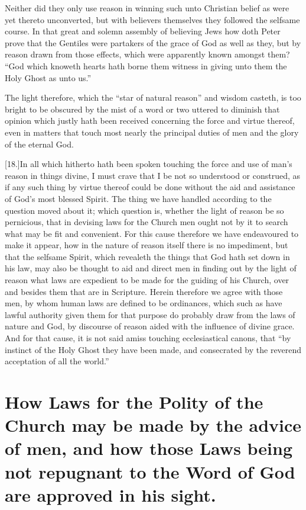 Neither did they only use reason in winning such unto Christian belief as were yet thereto unconverted, but with believers themselves they followed the selfsame course. In that great and solemn assembly of believing Jews how doth Peter prove that the Gentiles were partakers of the grace of God as well as they, but by reason drawn from those effects, which were apparently known amongst them? “God which knoweth hearts hath borne them witness in giving unto them the Holy Ghost as unto us.”

The light therefore, which the “star of natural reason” and wisdom casteth, is too bright to be obscured by the mist of a word or two uttered to diminish that opinion which justly hath been received concerning the force and virtue thereof, even in matters that touch most nearly the principal duties of men and the glory of the eternal God.

[18.]In all which hitherto hath been spoken touching the  force and use of man’s reason in things divine, I must crave that I be not so understood or construed, as if any such thing by virtue thereof could be done without the aid and assistance of God’s most blessed Spirit. The thing we have handled according to the question moved about it; which question is, whether the light of reason be so pernicious, that in devising laws for the Church men ought not by it to search what may be fit and convenient. For this cause therefore we have endeavoured to make it appear, how in the nature of reason itself there is no impediment, but that the selfsame Spirit, which revealeth the things that God hath set down in his law, may also be thought to aid and direct men in finding out by the light of reason what laws are expedient to be made for the guiding of his Church, over and besides them that are in Scripture. Herein therefore we agree with those men, by whom human laws are defined to be ordinances, which such as have lawful authority given them for that purpose do probably draw from the laws of nature and God, by discourse of reason aided with the influence of divine grace. And for that cause, it is not said amiss touching ecclesiastical canons, that “by instinct of the Holy Ghost they have been made, and consecrated by the reverend acceptation of all the world.”

\section*{How Laws for the Polity of the Church may be made by the advice of men, and how those Laws being not repugnant to the Word of God are approved in his sight.}

